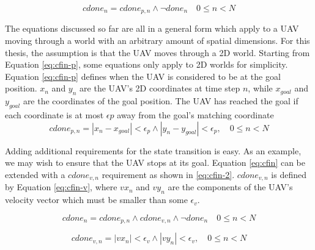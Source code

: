 \begin{equation}
\label{eq:cfin}
cdone_n =  cdone_{p,n} \wedge \neg done_n\quad 0 \leq n < N
\end{equation}

The equations discussed so far are all in a general form which apply to a UAV moving through a world with an arbitrary amount of spatial dimensions. For this thesis, the assumption is that the UAV moves through a 2D world. Starting from Equation \ref{eq:cfin-p}, some equations only apply to 2D worlds for simplicity. \\
Equation \ref{eq:cfin-p} defines when the UAV is considered to be at the goal position. $x_n$ and $y_n$ are the UAV's 2D coordinates at time step $n$, while $x_{goal}$ and $y_{goal}$ are the coordinates of the goal position. The UAV has reached the goal if each coordinate is at most $\epsilon{p}$ away from the goal's matching coordinate
\begin{equation}
\label{eq:cfin-p}
cdone_{p,n} = |x_{n} - x_{goal}| < \epsilon_{p} \wedge  |y_{n} - y_{goal}| < \epsilon_{p}, \quad 0 \leq n < N
\end{equation}

Adding additional requirements for the state transition is easy. As an example, we may wish to ensure that the UAV stops at its goal. Equation \ref{eq:cfin} can be extended with a $cdone_{v,n}$ requirement as shown in \ref{eq:cfin-2}. $cdone_{v,n}$ is defined by Equation \ref{eq:cfin-v}, where $vx_n$ and $vy_n$ are the components of the UAV's velocity vector which must be smaller than some $\epsilon_v$.

\begin{equation}
\label{eq:cfin-2}
cdone_n =  cdone_{p,n} \wedge cdone_{v,n} \wedge \neg done_n\quad 0 \leq n < N
\end{equation}

\begin{equation}
\label{eq:cfin-v}
cdone_{v,n} = |vx_{n}| < \epsilon_{v} \wedge  |vy_{n}| < \epsilon_{v}, \quad 0 \leq n < N
\end{equation}
